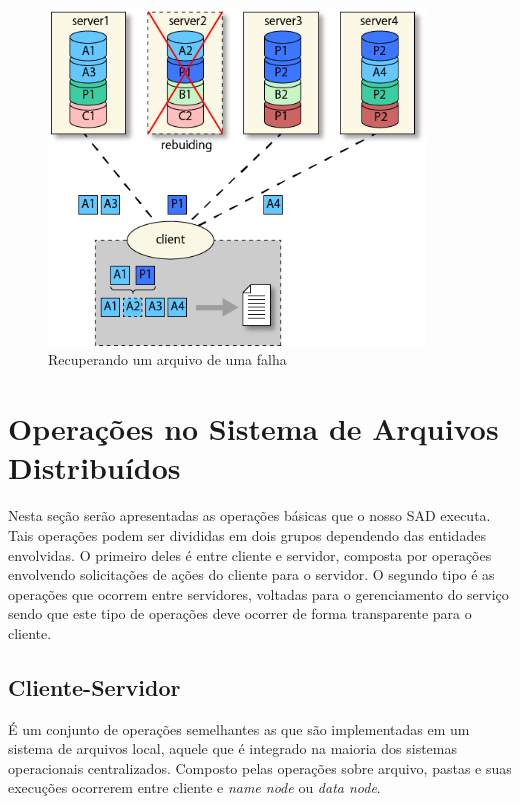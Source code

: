 \begin{figure}[htb]
	\begin{center}
		
		\includegraphics[clip,width=10.0cm]{images/image2.png}
		\caption{Recuperando um arquivo de uma falha}
		\label{fig:img2}
	\end{center}
\end{figure}

\section{Operações no Sistema de Arquivos Distribuídos}

Nesta seção serão apresentadas as operações básicas que o nosso SAD executa. Tais operações podem ser divididas em dois grupos dependendo das entidades envolvidas. O primeiro deles é entre cliente e servidor, composta por operações envolvendo solicitações de ações do cliente para o servidor. O segundo tipo é as operações que ocorrem entre servidores, voltadas para o gerenciamento do serviço sendo que este tipo de operações deve ocorrer de forma transparente para o cliente.
\\

\subsection{Cliente-Servidor}

É um conjunto de operações semelhantes as que são implementadas em um sistema de arquivos local, aquele que é integrado na maioria dos sistemas operacionais centralizados. Composto pelas operações sobre arquivo, pastas e suas execuções ocorrerem entre cliente e \textit{name node} ou \textit{data node}.

